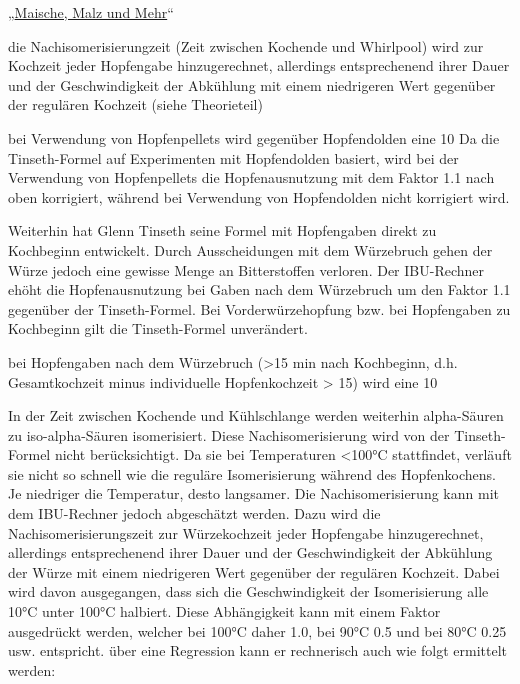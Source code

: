 \documentclass[a4paper,parskip=half]{scrartcl}
\begin{document}
„\href{https://www.maischemalzundmehr.de/index.php?inhaltmitte=toolsiburechner}{Maische, Malz und Mehr}“

die Nachisomerisierungzeit (Zeit zwischen Kochende und Whirlpool) wird zur Kochzeit jeder Hopfengabe hinzugerechnet, allerdings entsprechenend ihrer Dauer und der Geschwindigkeit der Abkühlung mit einem niedrigeren Wert gegenüber der regulären Kochzeit (siehe Theorieteil) 

bei Verwendung von Hopfenpellets wird gegenüber Hopfendolden eine 10%
Da die Tinseth-Formel auf Experimenten mit Hopfendolden basiert, wird bei der Verwendung von Hopfenpellets die Hopfenausnutzung mit dem Faktor 1.1 nach oben korrigiert, während bei Verwendung von Hopfendolden nicht korrigiert wird. 

Weiterhin hat Glenn Tinseth seine Formel mit Hopfengaben direkt zu Kochbeginn entwickelt. Durch Ausscheidungen mit dem Würzebruch gehen der Würze jedoch eine gewisse Menge an Bitterstoffen verloren. Der IBU-Rechner ehöht die Hopfenausnutzung bei Gaben nach dem Würzebruch um den Faktor 1.1 gegenüber der Tinseth-Formel. Bei Vorderwürzehopfung bzw. bei Hopfengaben zu Kochbeginn gilt die Tinseth-Formel unverändert. 

bei Hopfengaben nach dem Würzebruch (>15 min nach Kochbeginn, d.h. Gesamtkochzeit minus individuelle Hopfenkochzeit > 15) wird eine 10%

In der Zeit zwischen Kochende und Kühlschlange werden weiterhin alpha-Säuren zu iso-alpha-Säuren isomerisiert. Diese Nachisomerisierung wird von der Tinseth-Formel nicht berücksichtigt. Da sie bei Temperaturen <100°C stattfindet, verläuft sie nicht so schnell wie die reguläre Isomerisierung während des Hopfenkochens. Je niedriger die Temperatur, desto langsamer. Die Nachisomerisierung kann mit dem IBU-Rechner jedoch abgeschätzt werden. Dazu wird die Nachisomerisierungszeit zur Würzekochzeit jeder Hopfengabe hinzugerechnet, allerdings entsprechenend ihrer Dauer und der Geschwindigkeit der Abkühlung der Würze mit einem niedrigeren Wert gegenüber der regulären Kochzeit. Dabei wird davon ausgegangen, dass sich die Geschwindigkeit der Isomerisierung alle 10°C unter 100°C halbiert. Diese Abhängigkeit kann mit einem Faktor ausgedrückt werden, welcher bei 100°C daher 1.0, bei 90°C 0.5 und bei 80°C 0.25 usw. entspricht. über eine Regression kann er rechnerisch auch wie folgt ermittelt werden: 

\end{document}
